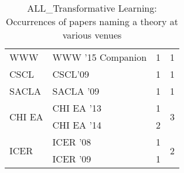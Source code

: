 \begin{table*}[t]
\begin{tabular}{llrr}
\multirow{1}{*}{WWW } & WWW '15 Companion & 1 & \multirow{1}{*}{1}\\
\multirow{1}{*}{CSCL} & CSCL'09 & 1 & \multirow{1}{*}{1}\\
\multirow{1}{*}{SACLA } & SACLA '09 & 1 & \multirow{1}{*}{1}\\
\multirow{2}{*}{CHI EA } & CHI EA '13 & 1 & \multirow{2}{*}{3}\\
& CHI EA '14 & 2 &\\
\multirow{2}{*}{ICER } & ICER '08 & 1 & \multirow{2}{*}{2}\\
& ICER '09 & 1 &\\
\end{tabular}
\caption{ALL\_Transformative Learning: Occurrences of papers naming a theory at various venues}
\end{table*}